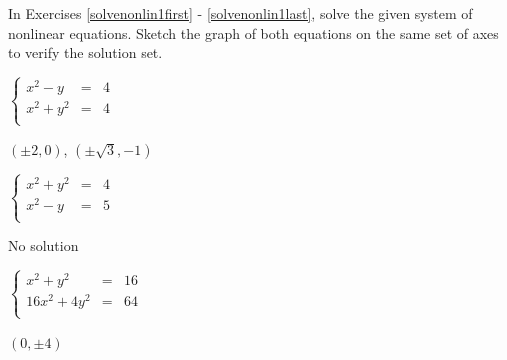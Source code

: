 \documentclass{ximera}
\begin{document}
	\author{Stitz-Zeager}



\label{ExercisesforNonLinearEquations}

\begin{question}
In Exercises \ref{solvenonlin1first} - \ref{solvenonlin1last}, solve the given system of nonlinear equations.  Sketch the graph of both equations on the same set of axes to verify the solution set. 

\begin{problem}\label{solvenonlin1first}
$\left\{\begin{array}{rcr}  x^2 - y & = & 4 \\ x^{2} + y^{2} & = & 4 \\ \end{array} \right.$ 

\begin{solution}
    $(\pm 2, 0)$, $\left(\pm \sqrt{3}, -1\right)$ 
\end{solution}

\end{problem}

\begin{problem}
$\left\{\begin{array}{rcr}  x^{2} + y^{2} & = & 4 \\ x^2 - y & = & 5 \\ \end{array} \right.$  

\begin{solution}
    No solution 
\end{solution}

\end{problem} 

\begin{problem}
$\left\{\begin{array}{rcr}  x^2+y^2 & = & 16 \\ 16x^{2} + 4y^{2} & = & 64 \\ \end{array} \right.$

\begin{solution}
     $(0, \pm 4)$
\end{solution}
\end{problem}


\end{question}
\end{document}
